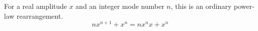 \documentclass{article}
\begin{document}
For a real amplitude $x$ and an integer mode number $n$, this is an
ordinary power-law rearrangement.
\begin{equation}
  n x^{n+1}+x^n=n x^n x+x^n
\end{equation}
\end{document}
